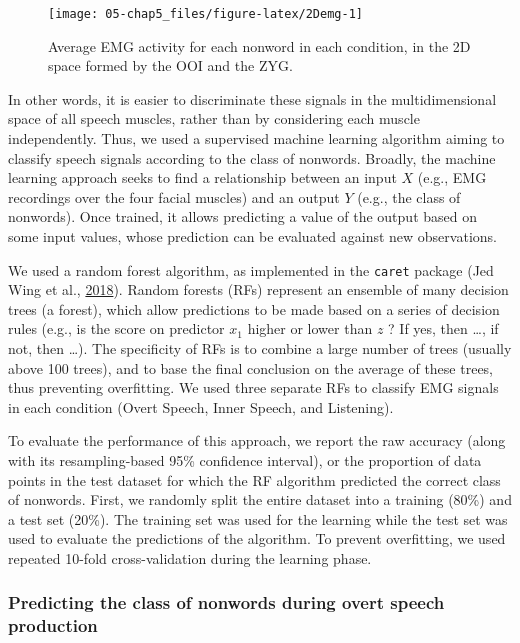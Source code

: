 \documentclass[a4paper,12pt,twoside,openright,oldfontcommands]{memoir}
\begin{document}
\begin{figure}[H]

{\centering \texttt{[image: 05-chap5\_files/figure-latex/2Demg-1]} 

}

\caption{Average EMG activity for each nonword in each condition, in the 2D space formed by the OOI and the ZYG.}\label{fig:2Demg}
\end{figure}

In other words, it is easier to discriminate these signals in the multidimensional space of all speech muscles, rather than by considering each muscle independently. Thus, we used a supervised machine learning algorithm aiming to classify speech signals according to the class of nonwords. Broadly, the machine learning approach seeks to find a relationship between an input \(X\) (e.g., EMG recordings over the four facial muscles) and an output \(Y\) (e.g., the class of nonwords). Once trained, it allows predicting a value of the output based on some input values, whose prediction can be evaluated against new observations.

We used a random forest algorithm, as implemented in the \texttt{caret} package (Jed Wing et al., \protect\hyperlink{ref-R-caret}{2018}). Random forests (RFs) represent an ensemble of many decision trees (a forest), which allow predictions to be made based on a series of decision rules (e.g., is the score on predictor \(x_{1}\) higher or lower than \(z\) ? If yes, then \ldots, if not, then \ldots). The specificity of RFs is to combine a large number of trees (usually above 100 trees), and to base the final conclusion on the average of these trees, thus preventing overfitting. We used three separate RFs to classify EMG signals in each condition (Overt Speech, Inner Speech, and Listening).

To evaluate the performance of this approach, we report the raw accuracy (along with its resampling-based 95\% confidence interval), or the proportion of data points in the test dataset for which the RF algorithm predicted the correct class of nonwords. First, we randomly split the entire dataset into a training (80\%) and a test set (20\%). The training set was used for the learning while the test set was used to evaluate the predictions of the algorithm. To prevent overfitting, we used repeated 10-fold cross-validation during the learning phase.

\hypertarget{predicting-the-class-of-nonwords-during-overt-speech-production}{%
\subsubsection{Predicting the class of nonwords during overt speech production}\label{predicting-the-class-of-nonwords-during-overt-speech-production}}
\end{document}

